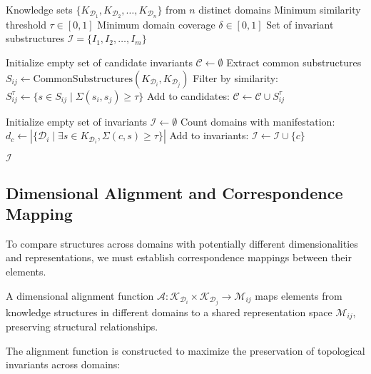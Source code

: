 \begin{algorithm}
\begin{algorithmic}[1]
\REQUIRE Knowledge sets $\{K_{\mathcal{D}_1}, K_{\mathcal{D}_2}, \ldots, K_{\mathcal{D}_n}\}$ from $n$ distinct domains
\REQUIRE Minimum similarity threshold $\tau \in [0,1]$
\REQUIRE Minimum domain coverage $\delta \in [0,1]$
\ENSURE Set of invariant substructures $\mathcal{I} = \{I_1, I_2, \ldots, I_m\}$

\STATE Initialize empty set of candidate invariants $\mathcal{C} \gets \emptyset$
    \STATE Extract common substructures $S_{ij} \gets \text{CommonSubstructures}(K_{\mathcal{D}_i}, K_{\mathcal{D}_j})$
    \STATE Filter by similarity: $S_{ij}^{\tau} \gets \{s \in S_{ij} \mid \Sigma(s_i, s_j) \geq \tau\}$
    \STATE Add to candidates: $\mathcal{C} \gets \mathcal{C} \cup S_{ij}^{\tau}$
\ENDFOR

\STATE Initialize empty set of invariants $\mathcal{I} \gets \emptyset$
    \STATE Count domains with manifestation: $d_c \gets |\{\mathcal{D}_i \mid \exists s \in K_{\mathcal{D}_i}, \Sigma(c, s) \geq \tau\}|$
        \STATE Add to invariants: $\mathcal{I} \gets \mathcal{I} \cup \{c\}$
    \ENDIF
\ENDFOR

\RETURN $\mathcal{I}$
\end{algorithmic}
\end{algorithm}

\subsection{Dimensional Alignment and Correspondence Mapping}

To compare structures across domains with potentially different dimensionalities and representations, we must establish correspondence mappings between their elements.

\begin{definition}
A dimensional alignment function $\mathcal{A}: \mathcal{K}_{\mathcal{D}_i} \times \mathcal{K}_{\mathcal{D}_j} \rightarrow \mathcal{M}_{ij}$ maps elements from knowledge structures in different domains to a shared representation space $\mathcal{M}_{ij}$, preserving structural relationships.
\end{definition}

The alignment function is constructed to maximize the preservation of topological invariants across domains:


